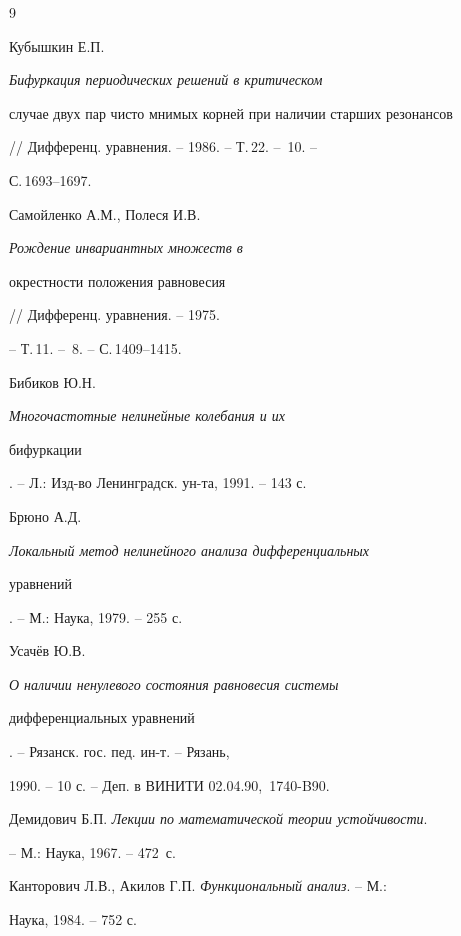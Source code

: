 \begin{thebibliography}{9} 


 




Кубышкин Е.П. {\em Бифуркация периодических решений в критическом 


случае двух пар чисто мнимых корней при наличии старших резонансов} 


// Дифференц. уравнения. -- 1986. -- Т.\,22. -- \No\,10. -- 


С.\,1693--1697. 




Самойленко А.М., Полеся И.В. {\em Рождение инвариантных множеств в 


окрестности положения равновесия} // Дифференц. уравнения. -- 1975. 


-- Т.\,11. -- \No\,8. -- С.\,1409--1415. 




Бибиков Ю.Н. {\em Многочастотные нелинейные колебания и их 


бифуркации}. -- Л.: Изд-во Ленинградск. ун-та, 1991. -- 143 с. 




Брюно А.Д. {\em Локальный метод нелинейного анализа дифференциальных 


уравнений}. -- М.: Наука, 1979. -- 255 с. 




Усач\"ев Ю.В. {\em О наличии ненулевого состояния равновесия системы 


дифференциальных уравнений}. -- Рязанск. гос. пед. ин-т. -- Рязань, 


1990. -- 10 с. -- Деп. в ВИНИТИ 02.04.90, \No\,1740-B90. 




Демидович Б.П. {\em Лекции по математической теории устойчивости}. 


-- М.: Наука, 1967. -- 472~с. 




Канторович Л.В., Акилов Г.П. {\em Функциональный анализ}. -- М.: 


Наука, 1984. -- 752 с. 


 


 


\end{thebibliography} 


 


\vskip 2cm 


 








 


\label{end} 


 


